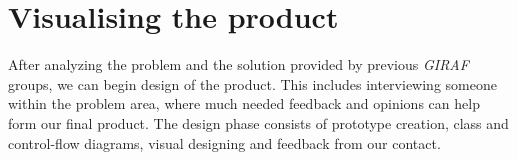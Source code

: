\chapter{Visualising the product}
After analyzing the problem and the solution provided by previous \textit{GIRAF} groups, we can begin design of the product.
This includes interviewing someone within the problem area, where much needed feedback and opinions can help form our final product.
The design phase consists of prototype creation, class and control-flow diagrams, visual designing and feedback from our contact.
